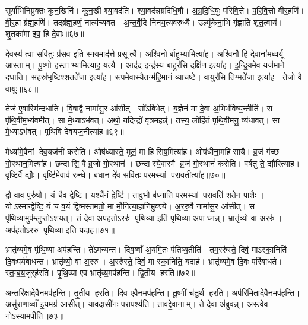 सूर्या॑भिनिम्रुक्तः कुन॒खिनि॑। कु॒न॒खी श्या॒वद॑ति। श्या॒वद॑न्नग्रदिधि॒षौ। अ॒ग्र॒दि॒धि॒षुः प॑रिवि॒त्ते। प॒रि॒वि॒त्तो वी॑र॒हणि॑। वी॒र॒हा ब्र॑ह्म॒हणि॑। तद्ब्र॑ह्म॒हणं॒ नात्य॑च्यवत। अ॒न्त॒र्वे॒दि निन॑य॒त्यव॑रुध्यै। उल्मु॑केना॒भि गृ॑ह्णाति शृत॒त्वाय॑। शृ॒तका॑मा इव॒ हि दे॒वाः॥६७॥\anuvakamend[अ॒न्या जि॑न्वन्त्यनु वि॒सृत्यै॒वमा॒हाशान्त आह॒ गुप्त्यै॑ छ॒न्नं ब्रह्माब्रवीद्द्वि॒तीय॑म॒भ्य॑पातय॒थ्सूर्या॑भिनिम्रुक्ते दे॒वाः]

दे॒वस्य॑ त्वा सवि॒तुः प्र॑स॒व इति॒ स्फ्यमाद॑त्ते॒ प्रसूत्यै। अ॒श्विनोर्बा॒हुभ्या॒मित्या॑ह। अ॒श्विनौ॒ हि दे॒वाना॑मध्व॒र्यू आस्ताम्। पू॒ष्णो हस्ताभ्या॒मित्या॑ह॒ यत्यै। आद॑द॒ इन्द्र॑स्य बा॒हुर॑सि॒ दक्षि॑ण॒ इत्या॑ह। इ॒न्द्रि॒यमे॒व यज॑माने दधाति। स॒हस्र॑भृष्टिश्श॒तते॑जा॒ इत्या॑ह। रू॒पमे॒वास्यै॒तन्म॑हि॒मानं॒ व्याच॑ष्टे। वा॒युर॑सि ति॒ग्मते॑जा॒ इत्या॑ह। तेजो॒ वै वा॒युः॥६८॥

तेज॑ ए॒वास्मि॑न्दधाति। वि॒षाद्वै नामा॑सु॒र आ॑सीत्। सो॑ऽबिभेत्। य॒ज्ञेन॑ मा दे॒वा अ॒भिभ॑विष्य॒न्तीति॑। स पृ॑थि॒वीम॒भ्य॑वमीत्। सा मे॒ध्याऽभ॑वत्। अथो॒ यदिन्द्रो॑ वृ॒त्रमहन्न्॑। तस्य॒ लोहि॑तं पृथि॒वीमनु॒ व्य॑धावत्। सा मे॒ध्याऽभ॑वत्। पृथि॑वि देवयज॒नीत्या॑ह॥६९॥

मेध्या॑मे॒वैनां देव॒यज॑नीं करोति। ओष॑ध्यास्ते॒ मूलं॒ मा हिसिष॒मित्या॑ह। ओष॑धीना॒महिसायै। व्र॒जं ग॑च्छ गो॒स्थान॒मित्या॑ह। छन्दासि॒ वै व्र॒जो गो॒स्थान॑। छन्दास्ये॒वास्मै व्र॒जं गो॒स्थानं॑ करोति। वर्\mbox{}ष॑तु ते॒ द्यौरित्या॑ह। वृष्टि॒र्वै द्यौः। वृष्टि॑मे॒वाव॑ रुन्धे। ब॒धा॒न दे॑व सवितः पर॒मस्यां परा॒वतीत्या॑ह॥७०॥

द्वौ वाव पुरु॑षौ। यं चै॒व द्वेष्टि॑। यश्चै॑नं॒ द्वेष्टि॑। तावु॒भौ ब॑ध्नाति पर॒मस्यां परा॒वति॑ श॒तेन॒ पाशैः। योऽस्मान्द्वेष्टि॒ यं च॑ व॒यं द्वि॒ष्मस्तमतो॒ मा मौ॒गित्या॒हानि॑म्रुक्त्ये। अ॒ररु॒र्वै नामा॑सु॒र आ॑सीत्। स पृ॑थि॒व्यामुप॑म्लुप्तोऽशयत्। तं दे॒वा अप॑हतो॒ऽररु॑ पृथि॒व्या इति॑ पृथि॒व्या अपाघ्नन्न्। भ्रातृ॑व्यो॒ वा अ॒ररु॑। अप॑हतो॒ऽररु॑ पृथि॒व्या इति॒ यदाह॑॥७१॥

भ्रातृ॑व्यमे॒व पृ॑थि॒व्या अप॑हन्ति। ते॑ऽमन्यन्त। दिव॒व्वाँ अ॒यमि॒तः प॑तिष्य॒तीति॑। तम॒ररु॑स्ते॒ दिवं॒ माऽस्का॒निति॑ दि॒वःपर्य॑बाधन्त। भ्रातृ॑व्यो॒ वा अ॒ररु॑। अ॒ररु॑स्ते॒ दिवं॒ मा स्का॒निति॒ यदाह॑। भ्रातृ॑व्यमे॒व दि॒वः परि॑बाधते। स्त॒म्ब॒य॒जुर्‌ह॑रति। पृ॒थि॒व्या ए॒व भ्रातृ॑व्य॒मप॑हन्ति। द्वि॒तीय हरति॥७२॥

अ॒न्तरि॑क्षादे॒वैन॒मप॑हन्ति। तृ॒तीय हरति। दि॒व ए॒वैन॒मप॑हन्ति। तू॒ष्णीं च॑तु॒र्थ ह॑रति। अप॑रिमितादे॒वैन॒मप॑हन्ति। असु॑राणा॒व्वाँ इ॒यमग्र॑ आसीत्। याव॒दासी॑नः परा॒पश्य॑ति। ताव॑द्दे॒वानाम्। ते दे॒वा अ॑ब्रुवन्न्। अस्त्वे॒व नो॒ऽस्यामपीति॑॥७३॥

